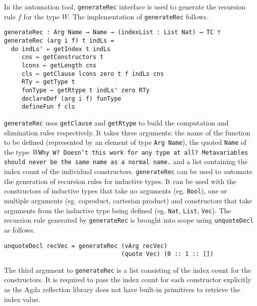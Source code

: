 \documentclass[sigplan,10pt]{acmart}
\begin{document}
In the automation tool, {\tt generateRec} interface is used to generate the resursion rule $f$ for the type $W$. The implementation of {\tt generateRec} follows.

\begin{center}
\begingroup
\fontsize{7pt}{9pt}\selectfont
\begin{Verbatim}
generateRec : Arg Name → Name → (indexList : List Nat) → TC ⊤
generateRec (arg i f) t indLs =
  do indLs' ← getIndex t indLs
     cns ← getConstructors t
     lcons ← getLength cns
     cls ← getClause lcons zero t f indLs cns
     RTy ← getType t
     funType ← getRtype t indLs' zero RTy
     declareDef (arg i f) funType
     defineFun f cls
\end{Verbatim}
\endgroup
\end{center}

\normalsize

{\tt generateRec} uses {\tt getClause} and {\tt getRtype} to build the computation and elimination rules respectively. It takes three arguments: the name of the function to be defined (represented by an element of type {\tt Arg Name}), the quoted {\tt Name} of the type \emph{W}\texttt{Why W? Doesn't this work for any type at all? Metavariables should never be the same name as a normal name.} and a list containing the index count of the individual constructors. {\tt generateRec} can be used to automate the generation of recursion rules for inductive types. It can be used with the constructors of inductive types that take no arguments (eg. {\tt Bool}), one or multiple arguments (eg. coproduct, cartesian product) and constructors that take arguments from the inductive type being defined (eg. {\tt Nat}, {\tt List}, {\tt Vec}). The recursion rule generated by {\tt generateRec} is brought into scope using {\tt unquoteDecl} as follows.

\begin{center}
\begingroup
\fontsize{8pt}{9pt}\selectfont
\begin{Verbatim}
unquoteDecl recVec = generateRec (vArg recVec)
                                 (quote Vec) (0 :: 1 :: [])
\end{Verbatim}
\endgroup
\end{center}

\normalsize

The third argument to {\tt generateRec} is a list consisting of the index count for the constructors. It is required to pass the index count for each constructor explicitly as the Agda reflection library does not have built-in primitives to retrieve the index value.
\end{document}
